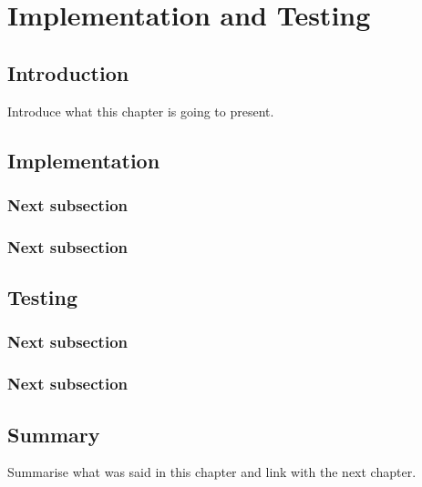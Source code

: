 \chapter{Implementation and Testing}

\section{Introduction}
Introduce what this chapter is going to present.
\section{Implementation}

\subsection{Next subsection}

\subsection{Next subsection}

\section{Testing}

\subsection{Next subsection}

\subsection{Next subsection}

\section{Summary}
Summarise what was said in this chapter and link with the next chapter.
